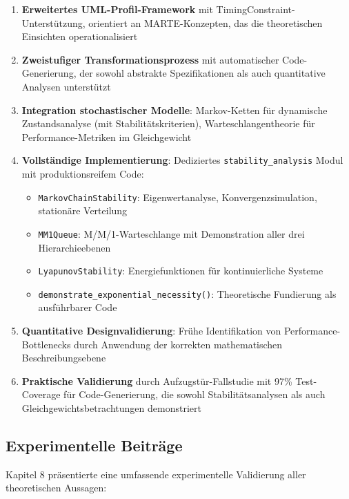 ﻿\documentclass[a4paper,12pt]{report}
\theoremstyle{definition}
\begin{document}
\begin{enumerate}
	\item[-] \textbf{Erweitertes UML-Profil-Framework} mit TimingConstraint-Unterstützung, orientiert an MARTE-Konzepten, das die theoretischen Einsichten operationalisiert
	
	\item[-] \textbf{Zweistufiger Transformationsprozess} mit automatischer Code-Generierung, der sowohl abstrakte Spezifikationen als auch quantitative Analysen unterstützt
	
	\item[-] \textbf{Integration stochastischer Modelle}: Markov-Ketten für dynamische Zustandsanalyse (mit Stabilitätskriterien), Warteschlangentheorie für Performance-Metriken im Gleichgewicht
	
	\item[-] \textbf{Vollständige Implementierung}: Dediziertes \texttt{stability\_analysis} Modul mit produktionsreifem Code:
	\begin{itemize}
		\item[-] \texttt{MarkovChainStability}: Eigenwertanalyse, Konvergenzsimulation, stationäre Verteilung
		\item[-] \texttt{MM1Queue}: M/M/1-Warteschlange mit Demonstration aller drei Hierarchieebenen
		\item[-] \texttt{LyapunovStability}: Energiefunktionen für kontinuierliche Systeme
		\item[-] \texttt{demonstrate\_exponential\_necessity()}: Theoretische Fundierung als ausführbarer Code
	\end{itemize}
	
	\item[-] \textbf{Quantitative Designvalidierung}: Frühe Identifikation von Performance-Bottle\-necks durch Anwendung der korrekten mathematischen Beschreibungsebene
	
	\item[-] \textbf{Praktische Validierung} durch Aufzugstür-Fallstudie mit 97\% Test-Coverage für Code-Generierung, die sowohl Stabilitätsanalysen als auch Gleichgewichtsbetrachtungen demonstriert
\end{enumerate}

\subsection{Experimentelle Beiträge}

Kapitel 8 präsentierte eine umfassende experimentelle Validierung aller theoretischen Aussagen:
\end{document}
